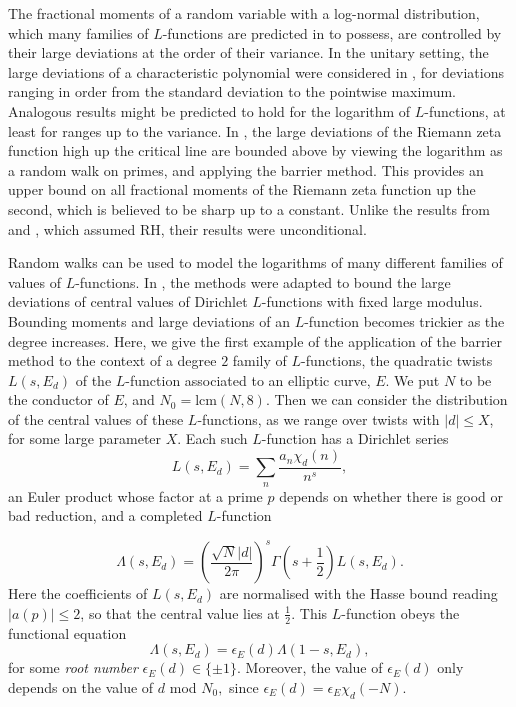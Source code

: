 \documentclass[12pt]{amsart}
\numberwithin{equation}{section}
\numberwithin{thm}{section}
\newcommand{\1}{\mathbf 1}
\begin{document}
The fractional moments of a random variable with a log-normal distribution, which many families of $L$-functions are predicted in \cite{KS2} to possess, are controlled by their large deviations at the order of their variance. In the unitary setting, the large deviations of a characteristic polynomial were considered in \cite{hko}, for deviations ranging in order from the standard deviation to the pointwise maximum. Analogous results might be predicted to hold for the logarithm of $L$-functions, at least for ranges up to the variance.  In \cite{AB}, the large deviations of the Riemann zeta function high up the critical line are bounded above by viewing the logarithm  as a random walk on primes, and applying the barrier method. This provides an upper bound on all fractional moments of the  Riemann zeta function up the second, which is believed to be sharp up to a constant. Unlike the results from \cite{Sound} and \cite{Harper}, which assumed RH, their results were unconditional.

Random walks can be used to model the logarithms of many different families of values of $L$-functions. In \cite{AC25}, the methods were adapted to bound the large deviations of central values of Dirichlet $L$-functions with fixed large modulus. Bounding moments and large deviations of an $L$-function becomes trickier as the degree increases. Here, we give the first example of the application of the barrier method to the context of a degree $2$ family of $L$-functions, the quadratic twists $L(s,E_d)$ of the $L$-function associated to an elliptic 
curve, $E$. We put $N$ to be the conductor of $E$, and $N_0=\text{lcm}(N,8).$ Then we can consider the distribution of the central values of these $L$-functions, as we range over twists with $|d|\le X$, for some large parameter $X$. Each such $L$-function has a Dirichlet series
\begin{equation}
	L(s,E_d)=\sum_n \frac{a_n\chi_d(n)}{n^s},
\end{equation}
 an Euler product whose factor at  a prime $p$ depends on whether there is good or bad reduction, and a completed $L$-function

\begin{equation}
	\Lambda(s,E_d)=\left(\frac{\sqrt{N}|d|}{2\pi}\right)^s\Gamma\left(s+\frac{1}{2}\right) L\left(s,E_d\right).
\end{equation}
Here the coefficients of $L\left(s,E_d\right)$ are normalised with the Hasse bound reading $|a(p)|\le 2$, so that the central value lies at $\frac{1}{2}.$ This $L$-function obeys the functional equation
\begin{equation}\label{functeqn}
	\Lambda(s,E_d)= \epsilon_E(d)\Lambda(1-s,E_d),
\end{equation}
for some \textit{root number} $\epsilon_E(d)\in \{\pm 1\}.$ 
Moreover, the value of $\epsilon_E(d)$ only depends on the value of $d$ mod $N_0,$ since $\epsilon_E(d)=\epsilon_E \chi_d(-N).$ 
\end{document}
